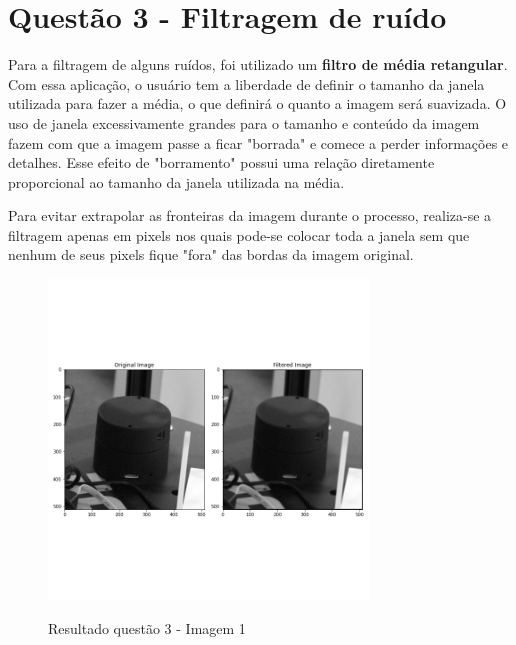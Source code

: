 \documentclass{article}
\begin{document}
\section{Questão 3 - Filtragem de ruído}
Para a filtragem de alguns ruídos, foi utilizado um \textbf{filtro de média retangular}. Com essa aplicação, o usuário tem a liberdade de definir o tamanho da janela utilizada para fazer a média, o que definirá o quanto a imagem será suavizada. O uso de janela excessivamente grandes para o tamanho e conteúdo da imagem fazem com que a imagem passe a ficar "borrada" e comece a perder informações e detalhes. Esse efeito de "borramento" possui uma relação diretamente proporcional ao tamanho da janela utilizada na média.

Para evitar extrapolar as fronteiras da imagem durante o processo, realiza-se a filtragem apenas em pixels nos quais pode-se colocar toda a janela sem que nenhum de seus pixels fique "fora" das bordas da imagem original.

\begin{figure}[H]
	\label{fig: q3_1}
	\begin{minipage}[b]{1.0\linewidth}
		\centering
		\centerline{\includegraphics[width=8.5cm]{Figures/results3_1}}
		\centerline{Resultado questão 3 - Imagem 1}\medskip	
	\end{minipage}
\end{figure}
\end{document}
